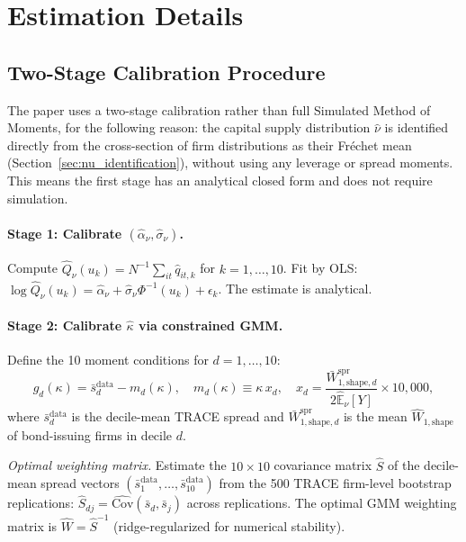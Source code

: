 \section{Estimation Details}
\label{app:estimation_details}

\subsection{Two-Stage Calibration Procedure}

The paper uses a two-stage calibration rather than full Simulated Method of Moments, for the following reason: the capital supply distribution $\hat{\nu}$ is identified directly from the cross-section of firm distributions as their Fr\'{e}chet mean (Section~\ref{sec:nu_identification}), without using any leverage or spread moments. This means the first stage has an analytical closed form and does not require simulation.

\paragraph{Stage 1: Calibrate $(\hat{\alpha}_\nu, \hat{\sigma}_\nu)$.}
Compute $\hat{Q}_\nu(u_k) = N^{-1}\sum_{it} \hat{q}_{it,k}$ for $k=1,\ldots,10$. Fit by OLS: $\log\hat{Q}_\nu(u_k) = \hat{\alpha}_\nu + \hat{\sigma}_\nu\Phi^{-1}(u_k) + \epsilon_k$. The estimate is analytical.

\paragraph{Stage 2: Calibrate $\hat{\kappa}$ via constrained GMM.}
Define the 10 moment conditions for $d = 1,\ldots,10$:
\begin{equation}
  g_d(\kappa) = \bar{s}_d^{\text{data}} - m_d(\kappa), \quad m_d(\kappa) \equiv \kappa\,x_d, \quad
  x_d = \frac{\bar{W}_{1,\text{shape},d}^{\text{spr}}}{2\hat{\mathbb{E}}_\nu[Y]} \times 10{,}000,
  \label{eq:gmm_moment}
\end{equation}
where $\bar{s}_d^{\text{data}}$ is the decile-mean TRACE spread and $\bar{W}_{1,\text{shape},d}^{\text{spr}}$ is the mean $\widehat{W}_{1,\text{shape}}$ of bond-issuing firms in decile $d$.

\textit{Optimal weighting matrix.} Estimate the $10\times 10$ covariance matrix $\hat{S}$ of the decile-mean spread vectors $(\bar{s}_1^{\text{data}},\ldots,\bar{s}_{10}^{\text{data}})$ from the 500 TRACE firm-level bootstrap replications: $\hat{S}_{dj} = \widehat{\mathrm{Cov}}(\bar{s}_d, \bar{s}_j)$ across replications. The optimal GMM weighting matrix is $\hat{W} = \hat{S}^{-1}$ (ridge-regularized for numerical stability).

